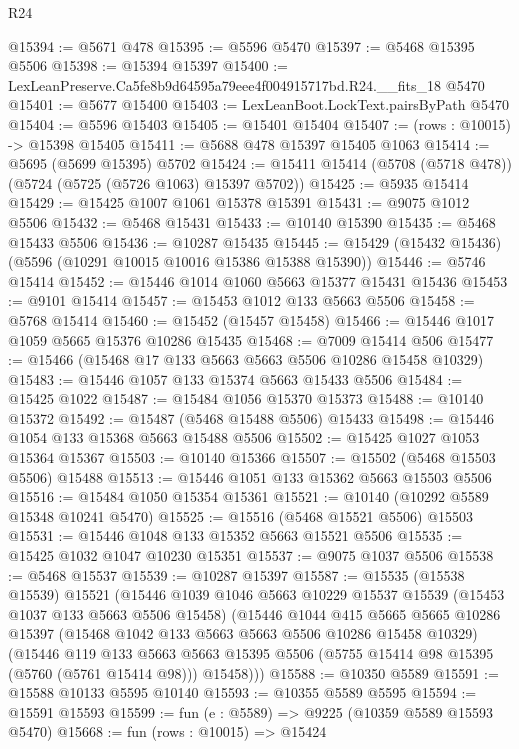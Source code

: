 \begin{lexlean}{R24}
\begin{coremodule}
@15394 := @5671 @478
@15395 := @5596 @5470
@15397 := @5468 @15395 @5506
@15398 := @15394 @15397
@15400 := LexLeanPreserve.Ca5fe8b9d64595a79eee4f004915717bd.R24.__fits_18 @5470
@15401 := @5677 @15400
@15403 := LexLeanBoot.LockText.pairsByPath @5470
@15404 := @5596 @15403
@15405 := @15401 @15404
@15407 := (rows : @10015) -> @15398 @15405
@15411 := @5688 @478 @15397 @15405 @1063
@15414 := @5695 (@5699 @15395) @5702
@15424 := @15411 @15414 (@5708 (@5718 @478)) (@5724 (@5725 (@5726 @1063) @15397 @5702))
@15425 := @5935 @15414
@15429 := @15425 @1007 @1061 @15378 @15391
@15431 := @9075 @1012 @5506
@15432 := @5468 @15431
@15433 := @10140 @15390
@15435 := @5468 @15433 @5506
@15436 := @10287 @15435
@15445 := @15429 (@15432 @15436) (@5596 (@10291 @10015 @10016 @15386 @15388 @15390))
@15446 := @5746 @15414
@15452 := @15446 @1014 @1060 @5663 @15377 @15431 @15436
@15453 := @9101 @15414
@15457 := @15453 @1012 @133 @5663 @5506
@15458 := @5768 @15414
@15460 := @15452 (@15457 @15458)
@15466 := @15446 @1017 @1059 @5665 @15376 @10286 @15435
@15468 := @7009 @15414 @506
@15477 := @15466 (@15468 @17 @133 @5663 @5663 @5506 @10286 @15458 @10329)
@15483 := @15446 @1057 @133 @15374 @5663 @15433 @5506
@15484 := @15425 @1022
@15487 := @15484 @1056 @15370 @15373
@15488 := @10140 @15372
@15492 := @15487 (@5468 @15488 @5506) @15433
@15498 := @15446 @1054 @133 @15368 @5663 @15488 @5506
@15502 := @15425 @1027 @1053 @15364 @15367
@15503 := @10140 @15366
@15507 := @15502 (@5468 @15503 @5506) @15488
@15513 := @15446 @1051 @133 @15362 @5663 @15503 @5506
@15516 := @15484 @1050 @15354 @15361
@15521 := @10140 (@10292 @5589 @15348 @10241 @5470)
@15525 := @15516 (@5468 @15521 @5506) @15503
@15531 := @15446 @1048 @133 @15352 @5663 @15521 @5506
@15535 := @15425 @1032 @1047 @10230 @15351
@15537 := @9075 @1037 @5506
@15538 := @5468 @15537
@15539 := @10287 @15397
@15587 := @15535
    (@15538 @15539)
    @15521
    (@15446
      @1039
      @1046
      @5663
      @10229
      @15537
      @15539
      (@15453 @1037 @133 @5663 @5506 @15458)
      (@15446
        @1044
        @415
        @5665
        @5665
        @10286
        @15397
        (@15468 @1042 @133 @5663 @5663 @5506 @10286 @15458 @10329)
        (@15446
          @119
          @133
          @5663
          @5663
          @15395
          @5506
          (@5755 @15414 @98 @15395 (@5760 (@5761 @15414 @98)))
          @15458)))
@15588 := @10350 @5589
@15591 := @15588 @10133 @5595 @10140
@15593 := @10355 @5589 @5595
@15594 := @15591 @15593
@15599 := fun (e : @5589) => @9225 (@10359 @5589 @15593 @5470)
@15668 := fun (rows : @10015) =>
  @15424

\end{coremodule}
\end{lexlean}
